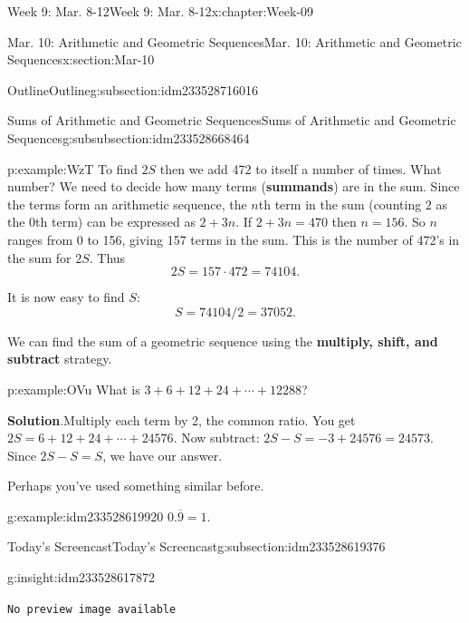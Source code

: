 \documentclass[oneside,10pt,]{book}
\newcommand{\blocktitlefont}{\relax}
\newcommand{\mono}[1]{\texttt{#1}}
\newcommand{\terminology}[1]{\textbf{#1}}
\numberwithin{equation}{section}
\newlength{\qrsize}
\newlength{\previewwidth}
\begin{document}
\begin{chapterptx}{Week 9: Mar. 8-12}{}{Week 9: Mar. 8-12}{}{}{x:chapter:Week-09}
\begin{sectionptx}{Mar. 10: Arithmetic and Geometric Sequences}{}{Mar. 10: Arithmetic and Geometric Sequences}{}{}{x:section:Mar-10}
\begin{subsectionptx}{Outline}{}{Outline}{}{}{g:subsection:idm233528716016}
\begin{subsubsectionptx}{Sums of Arithmetic and Geometric Sequences}{}{Sums of Arithmetic and Geometric Sequences}{}{}{g:subsubsection:idm233528668464}
\begin{example}{}{p:example:WzT}
To find \(2S\) then we add 472 to itself a number of times. What number? We need to decide how many terms (\terminology{summands}) are in the sum. Since the terms form an arithmetic sequence, the \(n\)th term in the sum (counting \(2\) as the 0th term) can be expressed as \(2 + 3n\). If \(2 + 3n = 470\) then \(n = 156\). So \(n\) ranges from 0 to 156, giving 157 terms in the sum. This is the number of 472's in the sum for \(2S\). Thus%
\begin{equation*}
2S = 157\cdot 472 = 74104\text{.}
\end{equation*}
%
\par
It is now easy to find \(S\):%
\begin{equation*}
S = 74104/2 = 37052\text{.}
\end{equation*}
%
\end{example}
We can find the sum of a geometric sequence using the \terminology{multiply, shift, and subtract} strategy.%
\begin{example}{}{p:example:OVu}%
What is \(3 + 6 + 12 + 24 + \cdots + 12288\)?%
\par\smallskip%
\noindent\textbf{\blocktitlefont Solution}.\hypertarget{p:solution:msL}{}\quad{}Multiply each term by 2, the common ratio. You get \(2S = 6 + 12 + 24 + \cdots + 24576\). Now subtract: \(2S - S = -3 + 24576 = 24573\). Since \(2S - S = S\), we have our answer.%
\end{example}
Perhaps you've used something similar before.%
\begin{example}{}{g:example:idm233528619920}%
\(0.\overline{9} = 1.\)%
\end{example}
\end{subsubsectionptx}
\end{subsectionptx}
%
%
\typeout{************************************************}
\typeout{************************************************}
%
\begin{subsectionptx}{Today's Screencast}{}{Today's Screencast}{}{}{g:subsection:idm233528619376}
\begin{insight}{}{g:insight:idm233528617872}%
\setlength{\qrsize}{9em}
\setlength{\previewwidth}{\linewidth}
\addtolength{\previewwidth}{-\qrsize}
\begin{tcbraster}[raster columns=2, raster column skip=1pt, raster halign=center, raster force size=false, raster left skip=0pt, raster right skip=0pt]%
\begin{tcolorbox}[previewstyle, width=\previewwidth]%
\mono{No preview image available}%

\end{tcolorbox}
\end{tcbraster}
\end{insight}
\end{subsectionptx}
\end{sectionptx}
\end{chapterptx}
\end{document}
